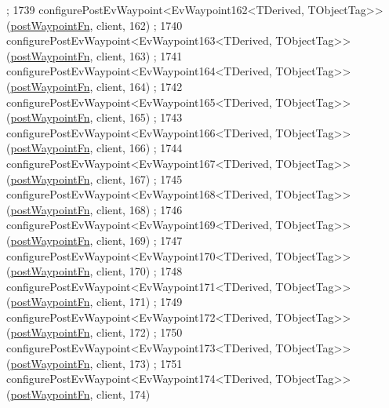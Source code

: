 \begin{DoxyCode}
      ;
1739     configurePostEvWaypoint<EvWaypoint162<TDerived, TObjectTag>>(\hyperlink{classmove__base__z__client_1_1WaypointEventDispatcher_acc538eb7506c13f7cca2268a1742dadd}{postWaypointFn}, client, 162)
      ;
1740     configurePostEvWaypoint<EvWaypoint163<TDerived, TObjectTag>>(\hyperlink{classmove__base__z__client_1_1WaypointEventDispatcher_acc538eb7506c13f7cca2268a1742dadd}{postWaypointFn}, client, 163)
      ;
1741     configurePostEvWaypoint<EvWaypoint164<TDerived, TObjectTag>>(\hyperlink{classmove__base__z__client_1_1WaypointEventDispatcher_acc538eb7506c13f7cca2268a1742dadd}{postWaypointFn}, client, 164)
      ;
1742     configurePostEvWaypoint<EvWaypoint165<TDerived, TObjectTag>>(\hyperlink{classmove__base__z__client_1_1WaypointEventDispatcher_acc538eb7506c13f7cca2268a1742dadd}{postWaypointFn}, client, 165)
      ;
1743     configurePostEvWaypoint<EvWaypoint166<TDerived, TObjectTag>>(\hyperlink{classmove__base__z__client_1_1WaypointEventDispatcher_acc538eb7506c13f7cca2268a1742dadd}{postWaypointFn}, client, 166)
      ;
1744     configurePostEvWaypoint<EvWaypoint167<TDerived, TObjectTag>>(\hyperlink{classmove__base__z__client_1_1WaypointEventDispatcher_acc538eb7506c13f7cca2268a1742dadd}{postWaypointFn}, client, 167)
      ;
1745     configurePostEvWaypoint<EvWaypoint168<TDerived, TObjectTag>>(\hyperlink{classmove__base__z__client_1_1WaypointEventDispatcher_acc538eb7506c13f7cca2268a1742dadd}{postWaypointFn}, client, 168)
      ;
1746     configurePostEvWaypoint<EvWaypoint169<TDerived, TObjectTag>>(\hyperlink{classmove__base__z__client_1_1WaypointEventDispatcher_acc538eb7506c13f7cca2268a1742dadd}{postWaypointFn}, client, 169)
      ;
1747     configurePostEvWaypoint<EvWaypoint170<TDerived, TObjectTag>>(\hyperlink{classmove__base__z__client_1_1WaypointEventDispatcher_acc538eb7506c13f7cca2268a1742dadd}{postWaypointFn}, client, 170)
      ;
1748     configurePostEvWaypoint<EvWaypoint171<TDerived, TObjectTag>>(\hyperlink{classmove__base__z__client_1_1WaypointEventDispatcher_acc538eb7506c13f7cca2268a1742dadd}{postWaypointFn}, client, 171)
      ;
1749     configurePostEvWaypoint<EvWaypoint172<TDerived, TObjectTag>>(\hyperlink{classmove__base__z__client_1_1WaypointEventDispatcher_acc538eb7506c13f7cca2268a1742dadd}{postWaypointFn}, client, 172)
      ;
1750     configurePostEvWaypoint<EvWaypoint173<TDerived, TObjectTag>>(\hyperlink{classmove__base__z__client_1_1WaypointEventDispatcher_acc538eb7506c13f7cca2268a1742dadd}{postWaypointFn}, client, 173)
      ;
1751     configurePostEvWaypoint<EvWaypoint174<TDerived, TObjectTag>>(\hyperlink{classmove__base__z__client_1_1WaypointEventDispatcher_acc538eb7506c13f7cca2268a1742dadd}{postWaypointFn}, client, 174)

\end{DoxyCode}
